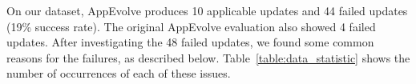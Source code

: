 On our dataset, AppEvolve produces 10 applicable updates and 44 failed
updates (19\% success rate). The original AppEvolve evaluation also showed 4 failed updates.
After investigating the 48 failed updates, we found some common reasons for
the failures, as described below. Table~\ref{table:data_statistic} shows
the number of occurrences of each of these issues.


